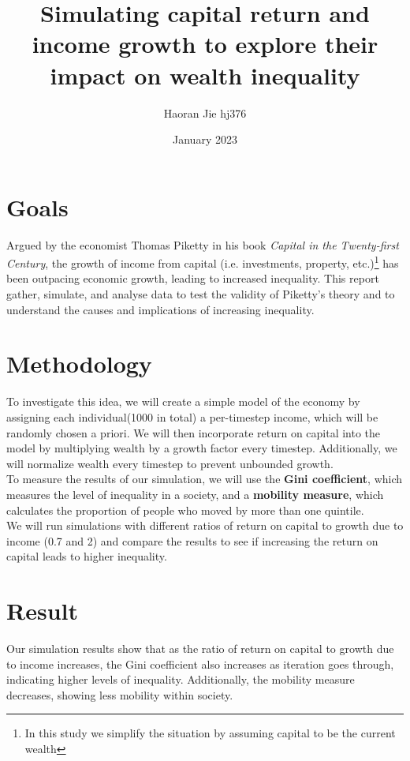 \documentclass{article}
\title{Simulating capital return and income growth to explore their impact on wealth inequality
}
\author{Haoran Jie hj376}
\date{January 2023}
\begin{document}
\maketitle


\section*{Goals}
Argued by the economist Thomas Piketty in his book \textit{Capital in the Twenty-first Century}, the growth of income from capital (i.e. investments, property, etc.)\footnote{In this study we simplify the situation by assuming capital to be the current wealth} has been outpacing economic growth, leading to increased inequality. This report gather, simulate, and analyse data to test the validity of Piketty's theory and to understand the causes and implications of increasing inequality.

\section*{Methodology}
To investigate this idea, we will create a simple model of the economy by assigning each individual(1000 in total) a per-timestep income, 
which will be randomly chosen a priori. We will then incorporate return on capital into the model by multiplying wealth by a growth factor every timestep.
Additionally, we will normalize wealth every timestep to prevent unbounded growth.\\
To measure the results of our simulation, we will use the \textbf{Gini coefficient}, which measures the level of inequality in a society, 
and a \textbf{mobility measure}, which calculates the proportion of people who moved by more than one quintile.\\
We will run simulations with different ratios of return on capital to growth due to income (0.7 and 2) and compare the results to see if increasing the return on capital leads to higher inequality.






\section*{Result}
Our simulation results show that as the ratio of return on capital to growth due to income increases, 
the Gini coefficient also increases as iteration goes through, indicating higher levels of inequality. 
Additionally, the mobility measure decreases, showing less mobility within society.
\end{document}
